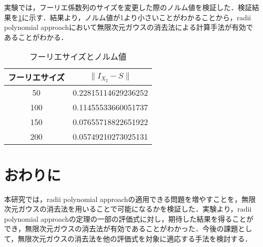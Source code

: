 \documentclass[a4paper,10pt,twocolumn]{jsarticle}
\newcommand{\rad}{radii polynomial approach}
\begin{document}
実験では，フーリエ係数列のサイズを変更した際のノルム値を検証した．検証結果を\cref{tab:norm-num}に示す．結果より，ノルム値が1より小さいことがわかることから，\rad{}において無限次元ガウスの消去法による計算手法が有効であることがわかる．

\begin{table}[htbp]
  \centering
  \caption{フーリエサイズとノルム値}
  \label{tab:norm-num}
  \begin{tabular}{c||c}
    フーリエサイズ & $\| I_{X_2}-S \|$ \\ \hline
    50 & 0.22815114629236252 \\
    100&0.11455533660051737\\
    150&0.07655718822651922\\
    200&0.05749210273025131
\end{tabular}
\end{table}

\vspace{-1mm}
\section{おわりに}
\vspace{-1mm}
本研究では，\rad{}の適用できる問題を増やすことを，無限次元ガウスの消去法を用いることで可能になるかを検証した．実験より，\rad{}の定理の一部の評価式に対し，期待した結果を得ることができ，無限次元ガウスの消去法が有効であることがわかった．今後の課題として，無限次元ガウスの消去法を他の評価式を対象に適応する手法を検討する．


\vspace{-1mm}

{\footnotesize

}
\end{document}
